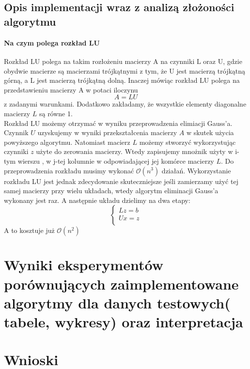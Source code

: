 \documentclass[11pt]{article}
\begin{document}
\begin{flushleft}
\subsection{Opis implementacji wraz z analizą złożoności algorytmu}
\paragraph{Na czym polega rozkład LU} Rozkład LU polega na takim rozłożeniu macierzy A na czynniki L oraz U, gdzie obydwie macierze są macierzami trójkątnymi z tym, że U jest macierzą trójkątną górną, a L jest macierzą trójkątną dolną. Inaczej mówiąc rozkład LU polega na przedstawieniu macierzy A w potaci iloczynu $$A = LU$$ z zadanymi warunkami. Dodatkowo zakładamy, że wszystkie elementy diagonalne macierzy $L$ są równe 1.\\ Rozkład LU możemy otrzymać w wyniku przeprowadzenia elimiacji Gauss'a. Czynnik $U$ uzyskujemy w wyniki przekształcenia macierzy $A$ w skutek użycia powyższego algorytmu. Natomiast macierz $L$ możemy stworzyć wykorzystując czynniki $z$ użyte do zerowania macierzy. Wtedy zapisujemy mnożnik użyty w i-tym wierszu , w j-tej kolumnie w odpowiadającej jej komórce macierzy $L$. Do przeprowadzenia rozkładu musimy wykonać $\mathcal{O}(n^3)$ działań. Wykorzystanie rozkładu LU jest jednak zdecydowanie skuteczniejsze jeśli zamierzamy użyć tej samej macierzy przy wielu układach, wtedy algorytm eliminacji Gauss'a wykonany jest raz. A następnie układu dzielimy na dwa etapy:
$$
\left\{ 
\begin{array}{ll}
Lz = b\\
Ux = z\\
\end{array} \right.
$$
A to kosztuje już $\mathcal{O}(n^2)$

\section{Wyniki eksperymentów porównujących zaimplementowane algorytmy dla danych testowych( tabele, wykresy) oraz interpretacja}
\section{Wnioski}
\end{flushleft}
\end{document}
